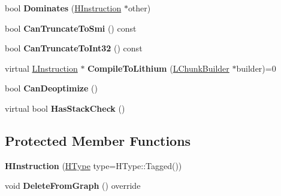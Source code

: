 \begin{DoxyCompactItemize}
\item 
bool {\bfseries Dominates} (\hyperlink{classv8_1_1internal_1_1_h_instruction}{H\+Instruction} $\ast$other)\hypertarget{classv8_1_1internal_1_1_h_instruction_a7cd697bfc5bdd48459eebcbd755b9242}{}\label{classv8_1_1internal_1_1_h_instruction_a7cd697bfc5bdd48459eebcbd755b9242}

\item 
bool {\bfseries Can\+Truncate\+To\+Smi} () const \hypertarget{classv8_1_1internal_1_1_h_instruction_acfd544bb90a73437660575233535b3ae}{}\label{classv8_1_1internal_1_1_h_instruction_acfd544bb90a73437660575233535b3ae}

\item 
bool {\bfseries Can\+Truncate\+To\+Int32} () const \hypertarget{classv8_1_1internal_1_1_h_instruction_af5a9f77ebff424833c6e25643743b32c}{}\label{classv8_1_1internal_1_1_h_instruction_af5a9f77ebff424833c6e25643743b32c}

\item 
virtual \hyperlink{classv8_1_1internal_1_1_l_instruction}{L\+Instruction} $\ast$ {\bfseries Compile\+To\+Lithium} (\hyperlink{classv8_1_1internal_1_1_l_chunk_builder}{L\+Chunk\+Builder} $\ast$builder)=0\hypertarget{classv8_1_1internal_1_1_h_instruction_a3428771211f74e7e291c6035503f35a2}{}\label{classv8_1_1internal_1_1_h_instruction_a3428771211f74e7e291c6035503f35a2}

\item 
bool {\bfseries Can\+Deoptimize} ()\hypertarget{classv8_1_1internal_1_1_h_instruction_a1c8ab2a3554f77765809ef84915ba974}{}\label{classv8_1_1internal_1_1_h_instruction_a1c8ab2a3554f77765809ef84915ba974}

\item 
virtual bool {\bfseries Has\+Stack\+Check} ()\hypertarget{classv8_1_1internal_1_1_h_instruction_a0e461c3f454423764e87a9b2224bb518}{}\label{classv8_1_1internal_1_1_h_instruction_a0e461c3f454423764e87a9b2224bb518}

\end{DoxyCompactItemize}
\subsection*{Protected Member Functions}
\begin{DoxyCompactItemize}
\item 
{\bfseries H\+Instruction} (\hyperlink{classv8_1_1internal_1_1_h_type}{H\+Type} type=H\+Type\+::\+Tagged())\hypertarget{classv8_1_1internal_1_1_h_instruction_a5e199eeb1213e9c24ce0056cc7660e73}{}\label{classv8_1_1internal_1_1_h_instruction_a5e199eeb1213e9c24ce0056cc7660e73}

\item 
void {\bfseries Delete\+From\+Graph} () override\hypertarget{classv8_1_1internal_1_1_h_instruction_a856030aab1da547c374de11ed865f441}{}\label{classv8_1_1internal_1_1_h_instruction_a856030aab1da547c374de11ed865f441}

\end{DoxyCompactItemize}
